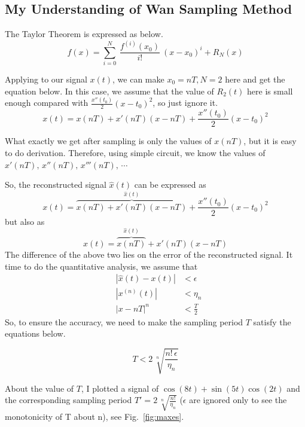 \documentclass{article}
\begin{document}
\subsection{My Understanding of Wan Sampling Method}
\label{wanSampling}

The Taylor Theorem is expressed as below.
$$
f(x) = \sum_{i = 0}^{N} ~ \frac{f^{(i)}(x_0)}{i!} ~ (x - x_0)^i + R_N(x)
$$

Applying to our signal $x(t)$, we can make $x_0 = nT, N = 2$ here and get the equation below. In this case, we assume that the value of $R_2(t)$ here is small enough compared with $\frac{x''(t_0)}{2}(x - t_0)^2$, so just ignore it.
\begin{equation}
	x(t) = x(nT) + x'(nT)(x - nT) + \frac{x''(t_0)}{2}(x - t_0)^2
\end{equation}


What exactly we get after sampling is only the values of $x(nT)$, but it is easy to do derivation. Therefore, using simple circuit, we know the values of $x'(nT),\,x''(nT),\,x'''(nT),\,\cdots$

So, the reconstructed signal $\hat{x}(t)$ can be expressed as
\begin{equation}
	x(t) = \overbrace{x(nT) + x'(nT)(x - nT)}^{\hat{x}(t)} + \frac{x''(t_0)}{2}(x - t_0)^2
\end{equation}
but also as
\begin{equation}
	x(t) = \overbrace{x(nT)}^{\hat{x}(t)} + x'(nT)(x - nT)
\end{equation}
The difference of the above two lies on the error of the reconstructed signal. It time to do the quantitative analysis, we assume that
\begin{equation}
	\begin{aligned}
		&|\hat{x}(t) - x(t)| &< \epsilon \\
		&|x^{(n)}(t)|  &< \eta_n \\ 
		&|x - nT|^n &< \frac{T}{2}
	\end{aligned}
\end{equation}
So, to ensure the accuracy, we need to make the sampling period $T$ satisfy the equations below.

\begin{equation}
	T < 2 \, \sqrt[n]{\frac{n! \,  \epsilon}{\eta_n}}
\end{equation}

About the value of $T$, I plotted a signal of $\cos(8t) + \sin(5t)\cos(2t)$ and the corresponding sampling period $T' = 2 \, \sqrt[n]{\frac{n!}{\eta_n}}$ ($\epsilon$ are ignored only to see the monotonicity of T about n), see Fig.~\ref{fig:maxes}.
\end{document}
